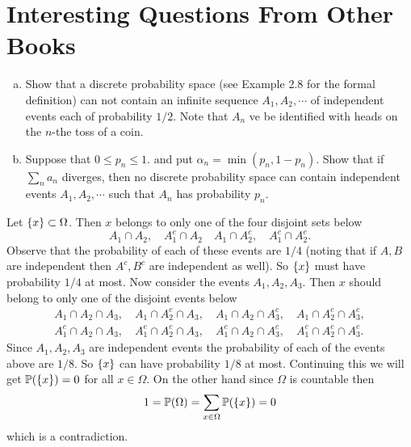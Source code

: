 \section{Interesting Questions From Other Books}

\begin{problem}
	\label{prob:DiscreteSpaceIndependentEvents}
	\begin{enumerate}[(a)]
		\item Show that a discrete probability space (see Example 2.8 for the formal definition) can not contain an infinite sequence $ A_1,A_2,\cdots $ of independent events each of probability $ 1/2 $. Note that $ A_n $ ve be identified with heads on the $ n $-the toss of a coin. 
		\item Suppose that $ 0\leq p_n \leq 1 $. and put $ \alpha_n = \min(p_n,1-p_n) $. Show that if $ \sum_n a_n $ diverges, then no discrete probability space can contain independent events $ A_1,A_2,\cdots $ such that $ A_n $ has probability $ p_n $.
	\end{enumerate}
\end{problem}

\begin{solution}
	\begin{enumerate}
		Let $ \{x\} \subset \Omega $. Then $ x $ belongs to only one of the four disjoint sets below
		\[ A_1\cap A_2,\quad A_1^c\cap A_2 \quad A_1\cap A_2^c,\quad A_1^c \cap A_2^c. \]
		Observe that the probability of each of these events are $ 1/4 $ (noting that if $ A,B $ are independent then $ A^c, B^c $ are independent as well). So $ \{x\} $ must have probability $ 1/4 $ at most. Now consider the events $ A_1,A_2,A_3 $. Then $ x $ should belong to only one of the disjoint events below
		\begin{align*}
			A_1\cap A_2\cap A_3, \quad A_1\cap A_2^c\cap A_3, \quad A_1\cap A_2\cap A_3^c, \quad A_1\cap A_2^c\cap A_3^c, \\
			A_1^c\cap A_2\cap A_3, \quad A_1^c\cap A_2^c\cap A_3, \quad A_1^c\cap A_2\cap A_3^c, \quad A_1^c\cap A_2^c\cap A_3^c. 
		\end{align*}
		Since $ A_1,A_2,A_3 $ are independent events the probability of each of the events above are $ 1/8 $. So $ \{x\} $ can have probability $ 1/8 $ at most. Continuing this we will get $ \mathbb{P}(\{x\}) = 0 $ for all $ x\in \Omega $. On the other hand since $ \Omega $ is countable then 
		\[ 1 = \mathbb{P}(\Omega ) = \sum_{x\in \Omega} \mathbb{P}(\{x\}) = 0 \]  
		which is a contradiction. 
	\end{enumerate}
\end{solution}

